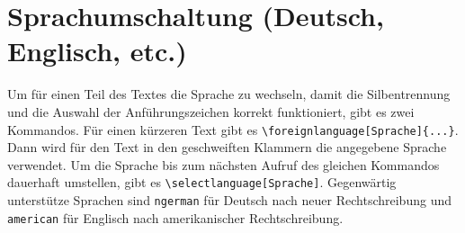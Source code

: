 \section{Sprachumschaltung (Deutsch, Englisch, etc.)}%
\label{sec:Sprache}
%
Um für einen Teil des Textes die Sprache zu wechseln, damit die
Silbentrennung und die Auswahl der Anführungszeichen
korrekt funktioniert, gibt es zwei Kommandos. Für einen kürzeren Text gibt es
\verb#\foreignlanguage[Sprache]{...}#. Dann wird für den Text in den
geschweiften Klammern die angegebene Sprache verwendet. Um die Sprache bis zum
nächsten Aufruf des gleichen Kommandos dauerhaft umstellen, gibt es
\verb#\selectlanguage[Sprache]#. Gegenwärtig unterstütze Sprachen sind
\texttt{ngerman} für Deutsch nach neuer
Rechtschreibung und \texttt{american} für
Englisch nach amerikanischer Rechtschreibung.